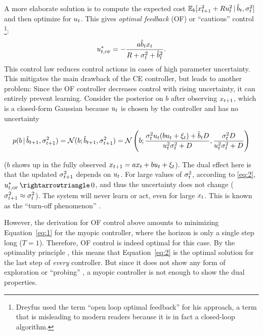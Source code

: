 A more elaborate solution is to compute the expected cost $\mathbb{E}_{b}[ x_{t+1}^2
+ R u_t ^2 \,|\, \hat b_{t}, \sigma^2_{t}]$ and then optimize for $u_t$. This gives
\emph{optimal feedback} (OF) or ``cautious'' control
\cite{Dreyfus:1964:Some}\footnote[][3mm]{Dreyfus
used the term ``open loop optimal feedback'' for his approach, a term that is
misleading to modern readers because it is in fact a closed-loop algorithm.}:
\begin{equation}\label{eq:2}
  u_{\tk,\OF}^* = -\frac{a\mbk x_\tk}{\CC + \sbk + \mbk^2}.
\end{equation}
This control law reduces control actions in cases of high parameter
uncertainty. This mitigates the main drawback of the CE controller, but leads to
another problem: Since the OF controller decreases control with rising
uncertainty, it can entirely prevent learning. Consider the posterior on
$b$ after observing $x_{t+1}$, which is a closed-form Gaussian because
$u_t$ is chosen by the controller and has no uncertainty
\begin{fullwidth}\vspace{-\baselineskip}
\begin{equation}\label{eq:belief-update}
  p(b\g \mbkp, \sbkp) = \N(b; \mbkp, \sbkp) = \N\left(b;
  \frac{\sbk \uk (b \uk + \dist_\tk) + \mbk \DC}{\uk^2 \sbk + \DC}, \frac{\sbk
  \DC}{\uk^2\sbk + \DC}\right)
\end{equation}
\end{fullwidth}
($b$ shows up in the fully observed $x_{t+1}=ax_t + bu_t+\xi_t$). The
dual effect here is that the updated $\sigma^2_{t+1}$ depends on $u_t$. For large values
of $\sigma_t ^2$, according to \eqref{eq:2},  $u_{\tk,\OF}^*\to 0$, and thus
the
uncertainty does not change  ($\sigma_{t+1} ^2 \approx \sigma_t ^2$). The
system will never learn or act, even for large $x_t$. This is known as the
``turn-off phenomenon'' \cite{Bar-Shalom:1981:Stochastic}.

However, the derivation for OF control above amounts to minimizing
Equation~\eqref{eq:1} for the myopic controller, where the horizon is only a
single step long ($T=1$). Therefore, OF control is indeed optimal for this
case. By the optimality principle \cite[]{Bertsekas:2005:Dynamic}, this
means that Equation~\eqref{eq:2} is the optimal solution for the last step of
\emph{every} controller. But since it does not show any form of exploration or
``probing'' \cite{Bar-Shalom.Tse:1976:Caution}, a myopic controller is not
enough to show the dual properties.

